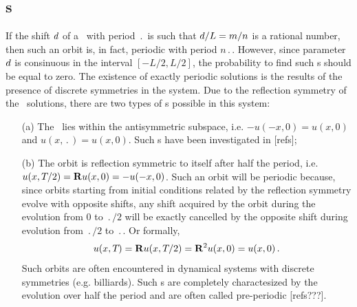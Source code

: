 \subsection{\Po s}
If the shift $d$ of a \rpo\ with period $\period{}$ is such 
that $d /L = m/n$ is a rational number, then such an orbit is, in
fact, periodic with period $n\period{}$.  However, since parameter 
$d$ is consinuous in the interval $[-L/2, L/2]$,
the probability to find such \po s should be equal to zero.  
The existence of exactly periodic solutions is the results of 
the presence of discrete symmetries in the system.  
Due to the reflection symmetry of the \KS\ solutions, there are 
two types of \po s possible in this system:
\begin{itemize}
\item[(a)] The \po\ lies within the antisymmetric subspace, i.e. 
$-u(-x,0) = u(x,0)$ and $u(x,\period{}) = u(x,0)$.  Such \po s have
been investigated in [refs];
\item[(b)] The orbit is reflection symmetric to itself after half
the period, i.e. $u(x,{T_{}}/2) = {\bf R} u(x,0) = -u(-x,0)$.
Such an orbit will be periodic because, since orbits starting from 
initial conditions related by the reflection symmetry evolve with 
opposite shifts, any shift acquired by the orbit during the evolution 
from $0$ to $\period{}/2$ will be exactly cancelled by the opposite 
shift during evolution from $\period{}/2$ to $\period{}$.  Or formally,
\[ u(x,{T_{}}) = {\bf R} u(x,{T_{}}/2) = 
   {\bf R}^2 u(x,0) = u(x,0)\,. \] 
Such orbits are often encountered in dynamical systems with discrete 
symmetries (e.g. billiards).  Such \po s are completely charactesized 
by the evolution over half the period and are often called 
pre-periodic [refs???].
\end{itemize}